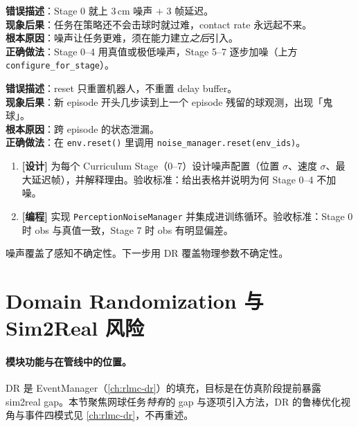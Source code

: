 \begin{pitfall}[噪声从训练第一步就加满]
\textbf{错误描述}：Stage 0 就上 3\,cm 噪声 $+$ 3 帧延迟。\\
\textbf{现象后果}：任务在策略还不会击球时就过难，contact rate 永远起不来。\\
\textbf{根本原因}：噪声让任务更难，须在能力建立\emph{之后}引入。\\
\textbf{正确做法}：Stage 0--4 用真值或极低噪声，Stage 5--7 逐步加噪（上方 \verb|configure_for_stage|）。
\end{pitfall}

\begin{pitfall}
\textbf{错误描述}：reset 只重置机器人，不重置 delay buffer。\\
\textbf{现象后果}：新 episode 开头几步读到上一个 episode 残留的球观测，出现「鬼球」。\\
\textbf{根本原因}：跨 episode 的状态泄漏。\\
\textbf{正确做法}：在 \verb|env.reset()| 里调用 \verb|noise_manager.reset(env_ids)|。
\end{pitfall}

\begin{practice}[本节动手任务]
\begin{enumerate}
  \item \textbf{[设计]} 为每个 Curriculum Stage（0--7）设计噪声配置（位置 $\sigma$、速度 $\sigma$、最大延迟帧），并解释理由。验收标准：给出表格并说明为何 Stage 0--4 不加噪。
  \item \textbf{[编程]} 实现 \verb|PerceptionNoiseManager| 并集成进训练循环。验收标准：Stage 0 时 obs 与真值一致，Stage 7 时 obs 有明显偏差。
\end{enumerate}
\end{practice}

\noindent{}噪声覆盖了感知不确定性。下一步用 DR 覆盖物理参数不确定性。

\section{Domain Randomization 与 Sim2Real 风险}
\label{sec:rlmc-strike-dr}

\paragraph{模块功能与在管线中的位置。}DR 是 EventManager（\cref{ch:rlmc-dr}）的填充，目标是在仿真阶段提前暴露 sim2real gap。本节聚焦网球任务\emph{特有}的 gap 与逐项引入方法，DR 的鲁棒优化视角与事件四模式见 \cref{ch:rlmc-dr}，不再重述。

